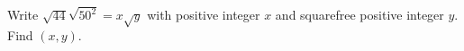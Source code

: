 Write $\sqrt{44}\sqrt{50^2}=x\sqrt y$ with positive integer $x$ and squarefree positive integer $y$. Find $(x,y)$.
